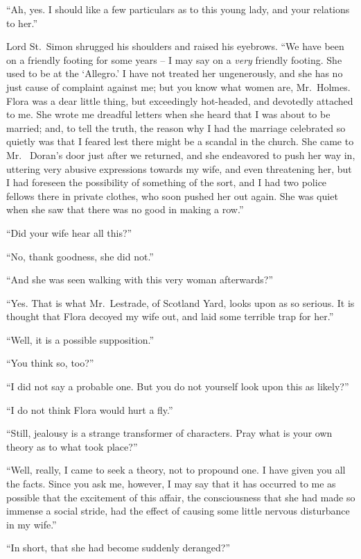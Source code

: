 “Ah, yes. I should like a few particulars as to this young
lady, and your relations to her.”

Lord St.~Simon shrugged his shoulders and raised his eyebrows.
“We have been on a friendly footing for some years -- I
may say on a \textit{very} friendly footing. She used to be at
the ‘Allegro.’ I have not treated her ungenerously, and she
has no just cause of complaint against me; but you know
what women are, Mr.~Holmes. Flora was a dear little thing,
but exceedingly hot-headed, and devotedly attached to me.
She wrote me dreadful letters when she heard that I was
about to be married; and, to tell the truth, the reason why I
had the marriage celebrated so quietly was that I feared lest
there might be a scandal in the church. She came to Mr.\ %
Doran’s door just after we returned, and she endeavored to
push her way in, uttering very abusive expressions towards
my wife, and even threatening her, but I had foreseen the
possibility of something of the sort, and I had two police fellows
there in private clothes, who soon pushed her out again.
She was quiet when she saw that there was no good in making
a row.”

“Did your wife hear all this?”

“No, thank goodness, she did not.”

“And she was seen walking with this very woman
afterwards?”

“Yes. That is what Mr.~Lestrade, of Scotland Yard, looks
upon as so serious. It is thought that Flora decoyed my
wife out, and laid some terrible trap for her.”

“Well, it is a possible supposition.”

“You think so, too?”

“I did not say a probable one. But you do not yourself
look upon this as likely?”

“I do not think Flora would hurt a fly.”

“Still, jealousy is a strange transformer of characters. Pray
what is your own theory as to what took place?”

“Well, really, I came to seek a theory, not to propound one.
I have given you all the facts. Since you ask me, however,
I may say that it has occurred to me as possible that the
excitement of this affair, the consciousness that she had made
so immense a social stride, had the effect of causing some little
nervous disturbance in my wife.”

“In short, that she had become suddenly deranged?”

